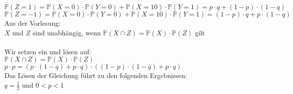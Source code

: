 \documentclass[a4paper]{article}
\begin{document}
$\mathbb{P}(Z = 1) = \mathbb{P}(X = 0) \cdot \mathbb{P}(Y = 0) + \mathbb{P}(X = 10) \cdot \mathbb{P}(Y = 1) = p \cdot q + (1 - p) \cdot (1 - q)$\\
$\mathbb{P}(Z = -1) = \mathbb{P}(X = 0) \cdot \mathbb{P}(Y = 0) + \mathbb{P}(X = 10) \cdot \mathbb{P}(Y = 1) = (1 - p) \cdot q + p \cdot (1 - q)$\\
Aus der Vorlesung:\\
$X$ und $Z$ sind unabhängig, wenn $\mathbb{P}(X \cap Z) = \mathbb{P}(X) \cdot \mathbb{P}(Z)$ gilt\\\\
Wir setzen ein und lösen auf:\\
$\mathbb{P}(X \cap Z) = \mathbb{P}(X) \cdot \mathbb{P}(Z)$\\
$p \cdot p = (p \cdot (1 - q) + p \cdot q) \cdot ((1 - p) \cdot (1 - q) + p \cdot q)$\\
Das Lösen der Gleichung führt zu den folgenden Ergebnissen:\\
$q = \frac{1}{2}$ und $0 < p < 1$
\end{document}
